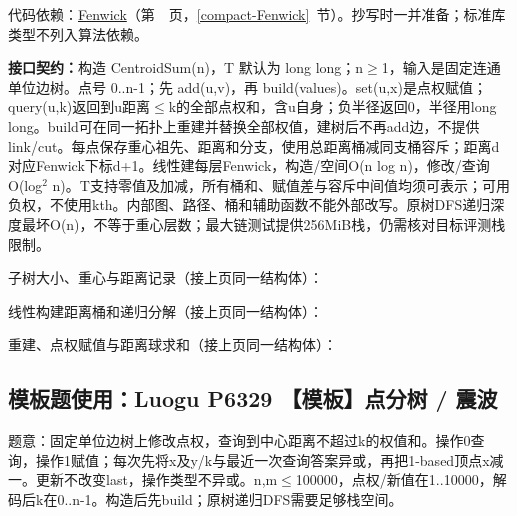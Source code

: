代码依赖：\hyperref[compact-Fenwick]{Fenwick}（第~\pageref{compact-Fenwick}~页，\ref{compact-Fenwick}~节）。抄写时一并准备；标准库类型不列入算法依赖。

{\sloppy{}\noindent\textbf{接口契约：}构造 CentroidSum(n)，T 默认为 long long；n$\ge$1，输入是固定连通单位边树。点号 0..n-1；先 add(u,v)，再 build(values)。set(u,x)是点权赋值；query(u,k)返回到u距离$\le$k的全部点权和，含u自身；负半径返回0，半径用long long。build可在同一拓扑上重建并替换全部权值，建树后不再add边，不提供link/cut。每点保存重心祖先、距离和分支，使用总距离桶减同支桶容斥；距离d对应Fenwick下标d+1。线性建每层Fenwick，构造/空间O(n log n)，修改/查询O(log$^{2}$ n)。T支持零值及加减，所有桶和、赋值差与容斥中间值均须可表示；可用负权，不使用kth。内部图、路径、桶和辅助函数不能外部改写。原树DFS递归深度最坏O(n)，不等于重心层数；最大链测试提供256MiB栈，仍需核对目标评测栈限制。\par}

\Needspace{387pt}



\newpage

\noindent 子树大小、重心与距离记录（接上页同一结构体）：



\newpage

\noindent 线性构建距离桶和递归分解（接上页同一结构体）：



\newpage

\noindent 重建、点权赋值与距离球求和（接上页同一结构体）：



\Needspace{555pt}

\subsection*{模板题使用：Luogu P6329 【模板】点分树 / 震波}

\label{usage-example-201}

题意：固定单位边树上修改点权，查询到中心距离不超过k的权值和。操作0查询，操作1赋值；每次先将x及y/k与最近一次查询答案异或，再把1-based顶点x减一。更新不改变last，操作类型不异或。n,m$\le$100000，点权/新值在1..10000，解码后k在0..n-1。构造后先build；原树递归DFS需要足够栈空间。

